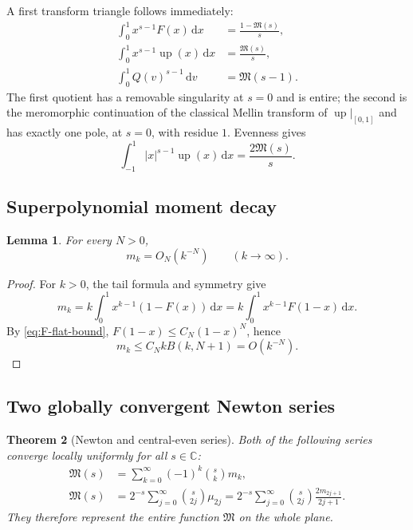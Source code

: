 \documentclass[11pt,oneside]{article}
\newtheorem{theorem}{Theorem}[section]
\newtheorem{lemma}[theorem]{Lemma}
\theoremstyle{definition}
\newcommand{\F}{F}
\newcommand{\Q}{Q}
\newcommand{\upf}{\operatorname{up}}
\newcommand{\M}{\mathfrak M}
\newcommand{\C}{\mathbb C}
\newcommand{\dd}{\,\mathrm d}
\begin{document}
A first transform triangle follows immediately:
\begin{align}
 \int_0^1x^{s-1}\F(x)\dd x&=\frac{1-\M(s)}s,
 \label{eq:Mellin-F}\\
 \int_0^1x^{s-1}\upf(x)\dd x&=\frac{\M(s)}s,
 \label{eq:Mellin-up-half}\\
 \int_0^1\Q(v)^{s-1}\dd v&=\M(s-1).
 \label{eq:Mellin-Q}
\end{align}
The first quotient has a removable singularity at \(s=0\) and is entire; the second
is the meromorphic continuation of the classical Mellin transform of \(\upf|_{[0,1]}\)
and has exactly one pole, at \(s=0\), with residue \(1\).  Evenness gives
\begin{equation}\label{eq:absolute-Mellin-up}
 \int_{-1}^1|x|^{s-1}\upf(x)\dd x=\frac{2\M(s)}s.
\end{equation}

\subsection{Superpolynomial moment decay}

\begin{lemma}\label{lem:moment-decay}
For every \(N>0\),
\begin{equation}\label{eq:moment-decay}
 m_k=O_N(k^{-N})\qquad(k\to\infty).
\end{equation}
\end{lemma}

\begin{proof}
For \(k>0\), the tail formula and symmetry give
\[
 m_k=k\int_0^1x^{k-1}(1-\F(x))\dd x
 =k\int_0^1x^{k-1}\F(1-x)\dd x.
\]
By \cref{eq:F-flat-bound}, \(\F(1-x)\le C_N(1-x)^N\), hence
\[
 m_k\le C_N kB(k,N+1)=O(k^{-N}).
\]
\end{proof}

\subsection{Two globally convergent Newton series}

\begin{theorem}[Newton and central-even series]\label{thm:newton}
Both of the following series converge locally uniformly for all \(s\in\C\):
\begin{align}
 \M(s)&=\sum_{k=0}^{\infty}(-1)^k\binom{s}{k}m_k,
 \label{eq:M-Newton}\\
 \M(s)&=2^{-s}\sum_{j=0}^{\infty}\binom{s}{2j}\mu_{2j}
 =2^{-s}\sum_{j=0}^{\infty}\binom{s}{2j}\frac{2m_{2j+1}}{2j+1}.
 \label{eq:M-central}
\end{align}
They therefore represent the entire function \(\M\) on the whole plane.
\end{theorem}
\end{document}

